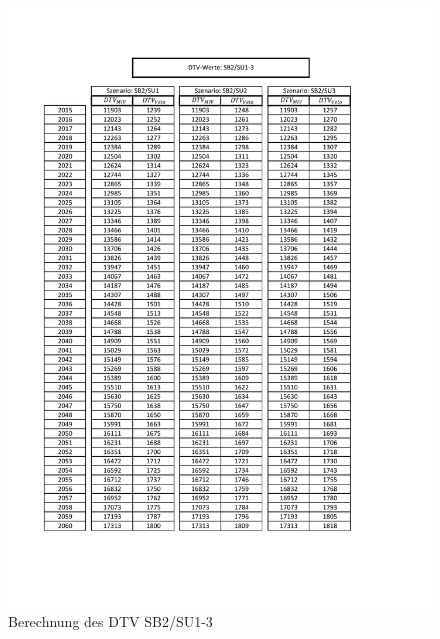 \begin{figure}[h!]
	\centering
	\includegraphics[width=\textwidth]{figures/Anhang/f-00-10-02-DTV-Modellierung}
	\caption{Berechnung des DTV SB2/SU1-3}
\end{figure}


